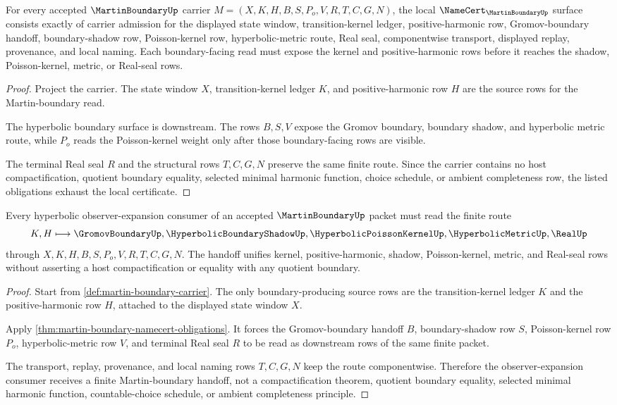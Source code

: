 \begin{theorem}
\label{thm:martin-boundary-namecert-obligations}
For every accepted $\MartinBoundaryUp$ carrier $M=(X,K,H,B,S,P_o,V,R,T,C,G,N)$, the local $\NameCert_{\MartinBoundaryUp}$ surface consists exactly of carrier admission for the displayed state window, transition-kernel ledger, positive-harmonic row, Gromov-boundary handoff, boundary-shadow row, Poisson-kernel row, hyperbolic-metric route, Real seal, componentwise transport, displayed replay, provenance, and local naming. Each boundary-facing read must expose the kernel and positive-harmonic rows before it reaches the shadow, Poisson-kernel, metric, or Real-seal rows.
\end{theorem}
\begin{proof}
Project the carrier. The state window $X$, transition-kernel ledger $K$, and positive-harmonic row $H$ are the source rows for the Martin-boundary read.

The hyperbolic boundary surface is downstream. The rows $B,S,V$ expose the Gromov boundary, boundary shadow, and hyperbolic metric route, while $P_o$ reads the Poisson-kernel weight only after those boundary-facing rows are visible.

The terminal Real seal $R$ and the structural rows $T,C,G,N$ preserve the same finite route. Since the carrier contains no host compactification, quotient boundary equality, selected minimal harmonic function, choice schedule, or ambient completeness row, the listed obligations exhaust the local certificate.
\end{proof}

\begin{theorem}
\label{thm:martin-boundary-shadow-handoff}
Every hyperbolic observer-expansion consumer of an accepted $\MartinBoundaryUp$ packet must read the finite route
$$
K,H \longmapsto \GromovBoundaryUp,\HyperbolicBoundaryShadowUp,\HyperbolicPoissonKernelUp,\HyperbolicMetricUp,\RealUp
$$
through $X,K,H,B,S,P_o,V,R,T,C,G,N$. The handoff unifies kernel, positive-harmonic, shadow, Poisson-kernel, metric, and Real-seal rows without asserting a host compactification or equality with any quotient boundary.
\end{theorem}
\begin{proof}
Start from \autoref{def:martin-boundary-carrier}. The only boundary-producing source rows are the transition-kernel ledger $K$ and the positive-harmonic row $H$, attached to the displayed state window $X$.

Apply \autoref{thm:martin-boundary-namecert-obligations}. It forces the Gromov-boundary handoff $B$, boundary-shadow row $S$, Poisson-kernel row $P_o$, hyperbolic-metric row $V$, and terminal Real seal $R$ to be read as downstream rows of the same finite packet.

The transport, replay, provenance, and local naming rows $T,C,G,N$ keep the route componentwise. Therefore the observer-expansion consumer receives a finite Martin-boundary handoff, not a compactification theorem, quotient boundary equality, selected minimal harmonic function, countable-choice schedule, or ambient completeness principle.
\end{proof}

